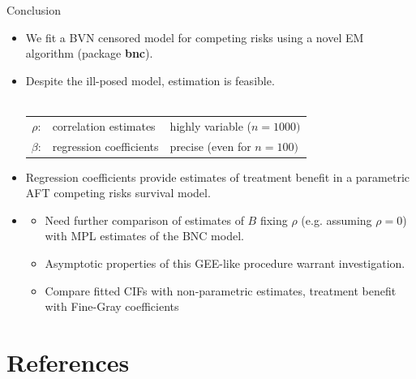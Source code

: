 \documentclass[10pt]{beamer}
\begin{document}
\begin{frame}{Conclusion}
  \begin{itemize}
  \item
    We fit a \alert{BVN censored model} for competing risks using a novel EM algorithm 
    (package \textbf{bnc}).
  \item
    Despite the \alert{ill-posed} model, estimation is feasible.\\
    {\color{DarkBlue}{Estimates:}} \\
   
    \begin{tabular}{ c l l }
    \hline
    $\rho$: &  \alert{correlation estimates} & highly variable ($n=1000)$ \\
    $\beta$: & \alert{regression coefficients}  &  precise (even for $n=100)$ \\ \hline  
    \end{tabular}
    
  \item Regression coefficients provide estimates of \alert{treatment benefit} 
  in a parametric \alert{AFT competing risks} survival model.
  \end{itemize}
  
  \begin{itemize}
  \item
    {\color{DarkBlue}{Outlook}}
    \begin{itemize}
    \item
      Need further comparison of estimates of $B$ fixing $\rho$ (e.g. assuming $\rho=0$) with MPL estimates of the BNC model.
    \item
      Asymptotic properties of this GEE-like procedure warrant investigation.
    \item 
      Compare fitted CIFs with non-parametric estimates, treatment benefit with Fine-Gray coefficients
    \end{itemize}
  \end{itemize}
\end{frame}







\section*{References}\label{references}
\end{document}
